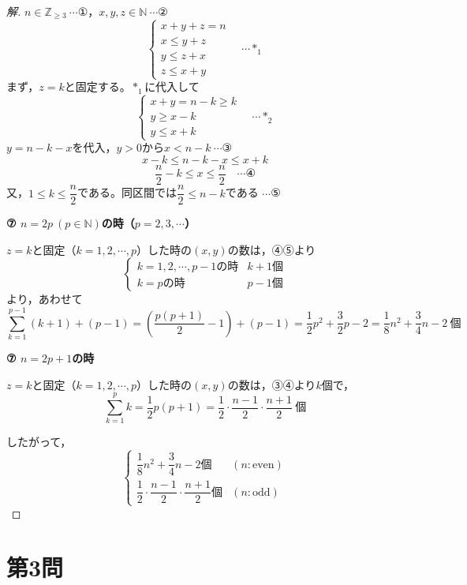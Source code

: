 \documentclass[../main.tex]{subfiles}
\begin{document}
\begin{proof}[解]
  $n\in\mathbb{Z}_{\ge3}\ \cdots$①，$x,y,z\in\mathbb{N}\ \cdots$②
  \[
    \begin{cases}
      x+y+z=n \\
      x\le y+z \\
      y\le z+x \\
      z\le x+y
    \end{cases}
    \quad\cdots *_1
  \]
  まず，$z=k$と固定する。$*_1$に代入して
  \[
    \begin{cases}
      x+y=n-k\ge k \\
      y\ge x-k \\
      y\le x+k
    \end{cases}
    \quad\cdots *_2
  \]
  $y=n-k-x$を代入，$y>0$から$x<n-k\ \cdots$③
  \[
    x-k\le n-k-x\le x+k
  \]
  \[
    \frac{n}{2}-k\le x\le\frac{n}{2}\quad\cdots\text{④}
  \]
  又，$1\le k\le\dfrac{n}{2}$である。同区間では$\dfrac{n}{2}\le n-k$である $\cdots$⑤

  \textbf{⑦ $n=2p\ (p\in\mathbb{N})$の時（$p=2,3,\cdots$）}

  $z=k$と固定（$k=1,2,\cdots,p$）した時の$(x,y)$の数は，④⑤より
  \[
    \begin{cases}
      k=1,2,\cdots,p-1\text{の時} & k+1\text{個} \\
      k=p\text{の時} & p-1\text{個}
    \end{cases}
  \]
  より，あわせて
  \[
    \sum_{k=1}^{p-1}(k+1)+(p-1)=\left(\frac{p(p+1)}{2}-1\right)+(p-1)=\frac{1}{2}p^2+\frac{3}{2}p-2=\frac18n^2+\frac34n-2\ \text{個}
  \]

  \textbf{⑦ $n=2p+1$の時}

  $z=k$と固定（$k=1,2,\cdots,p$）した時の$(x,y)$の数は，③④より$k$個で，
  \[
    \sum_{k=1}^{p}k=\frac12p(p+1)=\frac12\cdot\frac{n-1}{2}\cdot\frac{n+1}{2}\ \text{個}
  \]

  したがって，
  \[
    \begin{cases}
      \dfrac18n^2+\dfrac34n-2\text{個} & (n:\text{even}) \\[2mm]
      \dfrac12\cdot\dfrac{n-1}{2}\cdot\dfrac{n+1}{2}\text{個} & (n:\text{odd})
    \end{cases}
  \]
\end{proof}

\newpage

\section*{第3問}
\end{document}
